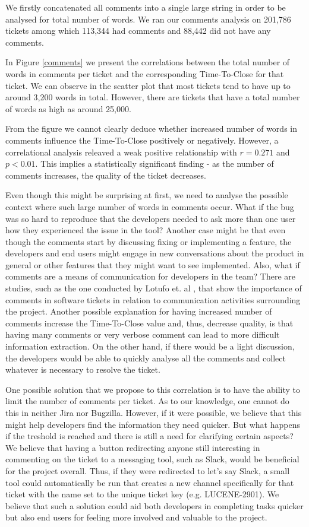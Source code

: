 \documentclass{mpaper}
\begin{document}
We firstly concatenated all comments into a single large string in order to be analysed for total number of words.
We ran our comments analysis on 201,786 tickets among which 113,344 had comments and 88,442 did not have any comments. 

In Figure \ref{comments} we present the correlations between the total number of words in comments per ticket and 
the corresponding Time-To-Close for that ticket. We can observe in the scatter plot that most tickets tend to 
have up to around 3,200 words in total. However, there are tickets that have a total number of words as high as 
around 25,000. 

From the figure we cannot clearly deduce whether increased number of words in comments influence 
the Time-To-Close positively or negatively. However, a correlational analysis releaved a weak 
positive relationship with $r = 0.271$ and $p < 0.01$. This implies a statistically significant finding - 
as the number of comments increases, the quality of the ticket decreases. 

Even though this might be surprising at first, we need to analyse the possible context where such large 
number of words in comments occur. What if the bug was so hard to reproduce that the developers needed to 
ask more than one user how they experienced the issue in the tool? Another case might be that even though 
the comments start by discussing fixing or implementing a feature, the developers and end users might 
engage in new conversations about the product in general or other features that they might want to see 
implemented. Also, what if comments are a means of communication for developers in the team? There are studies, 
such as the one conducted by Lotufo et. al \cite{lotufo2015modelling}, that show the importance of comments 
in software tickets in relation to communication activities surrounding the project. Another possible explanation 
for having increased number of comments increase the Time-To-Close value and, thus, decrease quality, is that 
having many comments or very verbose comment can lead to more difficult information extraction. On the other 
hand, if there would be a light discussion, the developers would be able to quickly analyse all the comments 
and collect whatever is necessary to resolve the ticket.

One possible solution that we propose to this correlation is to have the ability to limit the number of 
comments per ticket. As to our knowledge, one cannot do this in neither Jira nor Bugzilla. However, if it were 
possible, we believe that this might help developers find the information they need quicker. But what happens 
if the treshold is reached and there is still a need for clarifying certain aspects? We believe that having 
a button redirecting anyone still interesting in commenting on the ticket to a messaging tool, such as 
Slack, would be beneficial for the project overall. Thus, if they were redirected to let's say Slack, a small 
tool could automatically be run that creates a new channel specifically for that ticket with the name set 
to the unique ticket key (e.g. LUCENE-2901). We believe that such a solution could aid both developers in 
completing tasks quicker but also end users for feeling more involved and valuable to the project.
\end{document}
